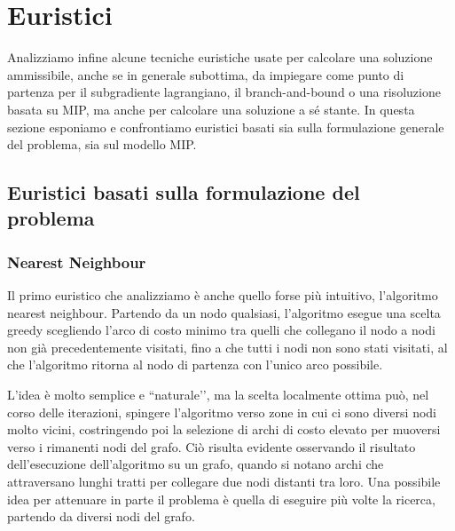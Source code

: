 \chapter{Euristici}
Analizziamo infine alcune tecniche euristiche usate per calcolare una soluzione ammissibile, anche se in generale subottima, da impiegare come punto di partenza per il subgradiente lagrangiano, il branch-and-bound o una risoluzione basata su MIP, ma anche per calcolare una soluzione a sé stante. In questa sezione esponiamo e confrontiamo euristici basati sia sulla formulazione generale del problema, sia sul modello MIP.

\section{Euristici basati sulla formulazione del problema}
\subsection{Nearest Neighbour}
Il primo euristico che analizziamo è anche quello forse più intuitivo, l’algoritmo nearest neighbour. Partendo da un nodo qualsiasi, l’algoritmo esegue una scelta greedy scegliendo l’arco di costo minimo tra quelli che collegano il nodo a nodi non già precedentemente visitati, fino a che tutti i nodi non sono stati visitati, al che l’algoritmo ritorna al nodo di partenza con l’unico arco possibile.

L’idea è molto semplice e ``naturale’’, ma la scelta localmente ottima può, nel corso delle iterazioni, spingere l’algoritmo verso zone in cui ci sono diversi nodi molto vicini, costringendo poi la selezione di archi di costo elevato per muoversi verso i rimanenti nodi del grafo. Ciò risulta evidente osservando il risultato dell’esecuzione dell’algoritmo su un grafo, quando si notano archi che attraversano lunghi tratti per collegare due nodi distanti tra loro. Una possibile idea per attenuare in parte il problema è quella di eseguire più volte la ricerca, partendo da diversi nodi del grafo.

